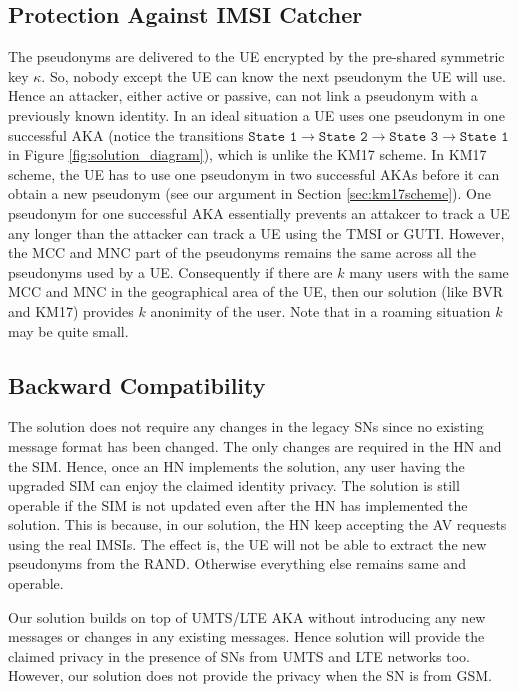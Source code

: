 \documentclass{llncs} %
\begin{document}
\subsection{Protection Against IMSI Catcher} The pseudonyms are delivered to the UE encrypted by the pre-shared symmetric key $\kappa$. So, nobody except the UE can know the next pseudonym the UE will use. Hence an attacker, either active or passive, can not link a pseudonym with a previously known identity. In an ideal situation a UE uses one pseudonym in one successful AKA (notice the transitions $ \texttt{State 1} \rightarrow \texttt{State 2} \rightarrow \texttt{State 3} \rightarrow \texttt{State 1}$ in Figure \ref{fig:solution_diagram}), which is unlike the KM17 scheme. In KM17 scheme, the UE has to use one pseudonym in two successful AKAs before it can obtain a new pseudonym (see our argument in Section \ref{sec:km17scheme}). One pseudonym for one successful AKA essentially prevents an attakcer to track a UE any longer than the attacker can track a UE using the TMSI or GUTI. However, the MCC and MNC part of the pseudonyms remains the same across all the pseudonyms used by a UE. Consequently if there are $k$ many users with the same MCC and MNC in the geographical area of the UE, then our solution (like BVR and KM17) provides $k$ anonimity of the user. Note that in a roaming situation $k$ may be quite small.


\subsection{Backward Compatibility} The solution does not require any changes in the legacy SNs since no existing message format has been changed. The only changes are required in the HN and the SIM. Hence, once an HN implements the solution, any user having the upgraded SIM can enjoy the claimed identity privacy. The solution is still operable if the SIM is not updated even after the HN has implemented the solution. This is because, in our solution, the HN keep accepting the AV requests using the real IMSIs. The effect is, the UE will not be able to extract the new pseudonyms from the RAND. Otherwise everything else remains same and operable. 

Our solution builds on top of UMTS/LTE AKA without introducing any new messages or changes in any existing messages. Hence solution will provide the claimed privacy in the presence of SNs from UMTS and LTE networks too. However, our solution does not provide the privacy when the SN is from GSM.
\end{document}
